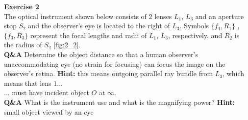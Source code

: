 \documentclass[main.tex]{subfiles}
\begin{document}
\textbf{Exercise 2}\\
The optical instrument shown below consists of 2 lenses $L_1$, $L_3$ and an aperture stop $S_2$ and the observer's eye is located to the right of $L_3$. Symbols $\{f_1 , R_1\}$ , $\{f_3 , R_3\}$ represent the focal lengths and radii of $L_1$, $L_3$, respectively, and $R_2$ is the radius of $S_2$ \ref{fig:2_2}.\\

\textbf{Q\&A} Determine the object distance so that a human observer's unaccommodating eye (no strain for focusing) can focus the image on the observer's retina. \textbf{Hint:} this means outgoing parallel ray bundle from $L_3$, which means that lens $1 ...$\\

... must have incident object $O$ at $\infty$. \\

\textbf{Q\&A} What is the instrument use and what is the magnifying power? \textbf{Hint:} small object viewed by an eye
\end{document}
